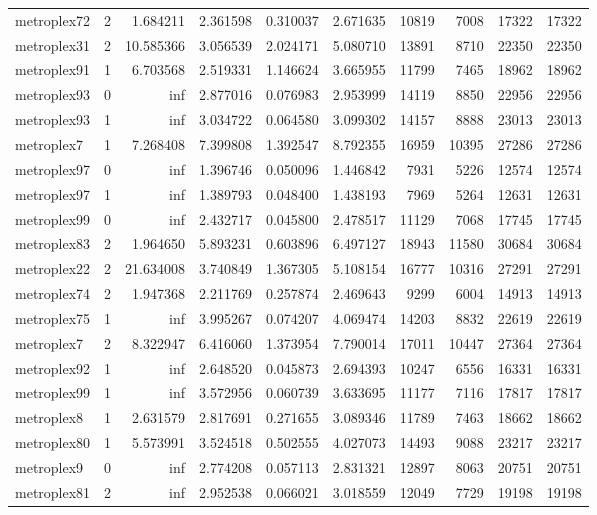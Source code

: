 \begin{longtable}{|l|r|r|r|r|r|r|r|r|r|}
metroplex72 & 2 & 1.684211 & 2.361598 & 0.310037 & 2.671635 & 10819 & 7008 & 17322 & 17322 \\
metroplex31 & 2 & 10.585366 & 3.056539 & 2.024171 & 5.080710 & 13891 & 8710 & 22350 & 22350 \\
metroplex91 & 1 & 6.703568 & 2.519331 & 1.146624 & 3.665955 & 11799 & 7465 & 18962 & 18962 \\
metroplex93 & 0 & inf & 2.877016 & 0.076983 & 2.953999 & 14119 & 8850 & 22956 & 22956 \\
metroplex93 & 1 & inf & 3.034722 & 0.064580 & 3.099302 & 14157 & 8888 & 23013 & 23013 \\
metroplex7 & 1 & 7.268408 & 7.399808 & 1.392547 & 8.792355 & 16959 & 10395 & 27286 & 27286 \\
metroplex97 & 0 & inf & 1.396746 & 0.050096 & 1.446842 & 7931 & 5226 & 12574 & 12574 \\
metroplex97 & 1 & inf & 1.389793 & 0.048400 & 1.438193 & 7969 & 5264 & 12631 & 12631 \\
metroplex99 & 0 & inf & 2.432717 & 0.045800 & 2.478517 & 11129 & 7068 & 17745 & 17745 \\
metroplex83 & 2 & 1.964650 & 5.893231 & 0.603896 & 6.497127 & 18943 & 11580 & 30684 & 30684 \\
metroplex22 & 2 & 21.634008 & 3.740849 & 1.367305 & 5.108154 & 16777 & 10316 & 27291 & 27291 \\
metroplex74 & 2 & 1.947368 & 2.211769 & 0.257874 & 2.469643 & 9299 & 6004 & 14913 & 14913 \\
metroplex75 & 1 & inf & 3.995267 & 0.074207 & 4.069474 & 14203 & 8832 & 22619 & 22619 \\
metroplex7 & 2 & 8.322947 & 6.416060 & 1.373954 & 7.790014 & 17011 & 10447 & 27364 & 27364 \\
metroplex92 & 1 & inf & 2.648520 & 0.045873 & 2.694393 & 10247 & 6556 & 16331 & 16331 \\
metroplex99 & 1 & inf & 3.572956 & 0.060739 & 3.633695 & 11177 & 7116 & 17817 & 17817 \\
metroplex8 & 1 & 2.631579 & 2.817691 & 0.271655 & 3.089346 & 11789 & 7463 & 18662 & 18662 \\
metroplex80 & 1 & 5.573991 & 3.524518 & 0.502555 & 4.027073 & 14493 & 9088 & 23217 & 23217 \\
metroplex9 & 0 & inf & 2.774208 & 0.057113 & 2.831321 & 12897 & 8063 & 20751 & 20751 \\
metroplex81 & 2 & inf & 2.952538 & 0.066021 & 3.018559 & 12049 & 7729 & 19198 & 19198 \\

\end{longtable}
